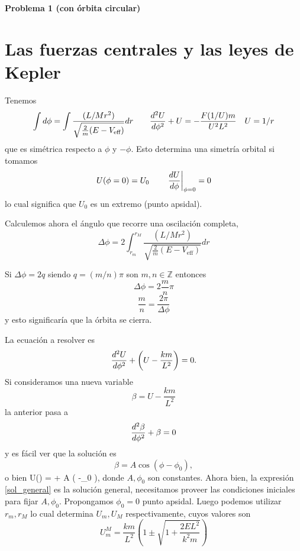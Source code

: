 \documentclass[10pt,oneside]{CBFT_book}
\begin{document}
\begin{ejemplo}{\bf Problema 1 (con órbita circular)}
 
\end{ejemplo}



\section{Las fuerzas centrales y las leyes de Kepler}

Tenemos 
\[
	\int d\phi = \int \frac{(L/Mr^2)}{\sqrt{ \frac{2}{m}(E - V_{\text{eff}})}} dr	\qquad
	\dtot[2]{U}{\phi} + U  = - \frac{F(1/U) m}{U^2 L^2} \quad U = 1/r
\]
que es simétrica respecto a $\phi$ y $-\phi$. Esto determina una simetría orbital si
tomamos
\[
	U(\phi=0) = U_0 	\qquad		\left. \dtot{U}{\phi} \right|_{\phi=0}= 0
\]
lo cual significa que $U_0$ es un extremo (punto apsidal).

Calculemos ahora el ángulo que recorre una oscilación completa,
\[
	\Delta \phi = 2\int_{r_m}^{r_M} \frac{(L/Mr^2)}{\sqrt{ \frac{2}{m}(E - V_{\text{eff}})}} dr
\]

Si $\Delta \phi = 2 q $ siendo $q= (m/n)\pi $ son $m,n \in \mathbb{Z}$ entonces
\[
	\Delta \phi = 2 \frac{m}{n} \pi 
\]
\[
	\frac{m}{n} = \frac{2\pi}{\Delta \phi}
\]
y esto significaría que la órbita se cierra.

La ecuación a resolver es 
\[
	\dtot[2]{U}{\phi} + \left( U  - \frac{k m}{L^2} \right) = 0.
\]
Si consideramos una nueva variable 
\[
	\beta = U  - \frac{k m}{L^2}
\]
la anterior pasa a 
\[
	\dtot[2]{\beta}{\phi} + \beta = 0
\]
y es fácil ver que la solución es
\[
	\beta = A \cos( \phi -\phi_0 ),
\]
o bien 
\be
	U(\phi) =  +  A \cos( \phi -\phi_0 ),
	\label{sol_general}
\ee
donde $A,\phi_0$ son constantes. Ahora bien, la expresión \eqref{sol_general} es la solución general,
necesitamos proveer las condiciones iniciales para fijar $ A, \phi_0 $. Propongamos $ \phi_0 = 0 $
punto apsidal.
Luego podemos utilizar $r_m, r_M$ lo cual determina $U_m, U_M$ respectivamente, cuyos valores son 
\[
	U^M_m = \frac{km}{L^2} \left( 1 \pm \sqrt{1 + \frac{2EL^2}{k^2 m} }\right)
\]
\end{document}
